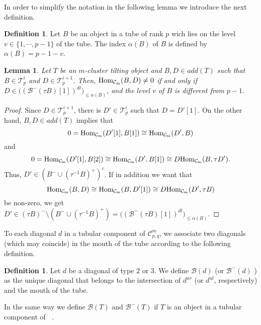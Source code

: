 \documentclass{amsart}
\theoremstyle{plain}
\newtheorem{lema}[teo]{Lemma}
\theoremstyle{definition}
\newtheorem{defi}[teo]{Definition}
\begin{document}
In order to simplify the notation in the following lemma we introduce the next definition. \\

\begin{defi}
Let  $B$ be  an object in a tube of rank $p$ wich lies on the level
$v\in \{1, \cdots, p-1\}$ of the  tube. The index   $\alpha(B)$ of $B$ is defined by  $\alpha(B)=p-1-v$.

\end{defi}

\begin{lema}\label{morfismos entre un tubo y el siguiente}
Let $T$  be an  $m$-cluster tilting object and  $B,D \in add (T)$ such that $B\in \mathcal{T}^i_p$ and $D\in \mathcal{T}^{i+1}_p$. Then,
${\mathop{\rm Hom_{\mathcal{C}_m}}\nolimits}(B,D)\neq 0$ if and only if $D\in
\bigl ((\mathcal{B}^-(\tau B)[1])^{dl}\bigr)_{\leq \alpha(B)}$,    and the level  $v$ of $B$ is different from $p-1$.

 
\end{lema}

\begin{proof}
 Since $D\in \mathcal{T}^{i+1}_p$,  there is $D'\in \mathcal{T}_p^i$ such that $D=D'[1]$. On the other hand,   $B,D \in add (T)$ implies that   $$0={\mathop{\rm Hom_{\mathcal{C}_m}}\nolimits}(D'[1],B[1])\cong
{\mathop{\rm Hom_{\mathcal{C}_m}}\nolimits}(D',B)$$ and  $$ 0={\mathop{\rm Hom_{\mathcal{C}_m}}\nolimits}(D'[1],B[2])\cong {\mathop{\rm Hom_{\mathcal{C}_m}}\nolimits}(D',B[1])\cong D
{\mathop{\rm Hom_{\mathcal{C}_m}}\nolimits}(B, \tau D').$$ Thus,  $D'\in ( B^-\cup (\tau^{-1}
B)^+)^c$. If in addition we want that $$ {\mathop{\rm Hom_{\mathcal{C}_m}}\nolimits}(B,D)\cong {\mathop{\rm Hom_{\mathcal{C}_m}}\nolimits}(B,D'[1])\cong
 D{\mathop{\rm Hom_{\mathcal{C}_m}}\nolimits}(D',\tau B)$$ be non-zero, we get
 $D'\in (\tau B)^-\setminus (B^-\cup (\tau^{-1} B)^+)=\bigl ((\mathcal{B}^-(\tau B)[1])^{dl}\bigr)_{\leq \alpha(B)}$.
 \end{proof}

To each diagonal $d$ in a tubular component of $\mathcal{C}^m_{p,q}$, we  associate two diagonals (which may coincide) in the mouth of the tube according to the following definition.\\

\begin{defi}
Let  $d$ be a  diagonal of type $2$ or $3$. We define  $\mathcal{B}(d)$ (or $\mathcal{B}^{-}(d)$ ) as the unique  diagonal that belongs to the intersection of $d^{ur}$ (or $d^{ul}$, respectively) and the mouth of the tube.    \

In the same way we define $\mathcal{B}(T)$ and $\mathcal{B}^{-}(T)$  if  $T$ is an  object in a tubular component of ${\mathop{\mathcal{C}_m}\nolimits}$.
\end{defi}
\end{document}
